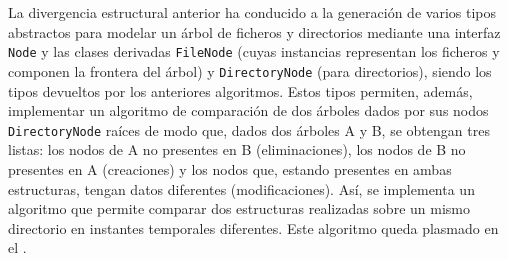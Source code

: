 La divergencia estructural anterior ha conducido a la generación de varios tipos abstractos para modelar un árbol de ficheros y directorios mediante una interfaz \texttt{Node} y las clases derivadas \texttt{FileNode} (cuyas instancias representan los ficheros y componen la frontera del árbol) y \texttt{DirectoryNode} (para directorios), siendo los tipos devueltos por los anteriores algoritmos. Estos tipos permiten, además, implementar un algoritmo de comparación de dos árboles dados por sus nodos \texttt{DirectoryNode} raíces de modo que, dados dos árboles A y B, se obtengan tres listas: los nodos de A no presentes en B (eliminaciones), los nodos de B no presentes en A (creaciones) y los nodos que, estando presentes en ambas estructuras, tengan datos diferentes (modificaciones). Así, se implementa un algoritmo que permite comparar dos estructuras realizadas sobre un mismo directorio en instantes temporales diferentes. Este algoritmo queda plasmado en el .

